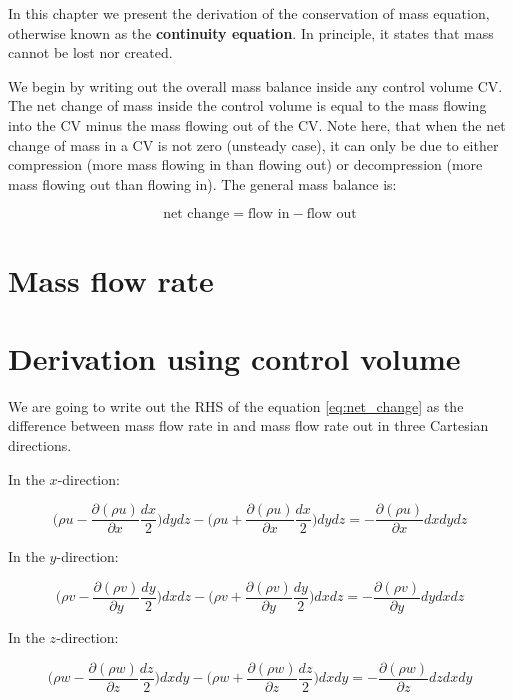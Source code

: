 In this chapter we present the derivation of the conservation of mass equation, otherwise known as the \textbf{continuity equation}. In principle, it states that mass cannot be lost nor created.

We begin by writing out the overall mass balance inside any control volume CV. The net change of mass inside the control volume is equal to the mass flowing into the CV minus the mass flowing out of the CV. Note here, that when the net change of mass in a CV is not zero (unsteady case), it can only be due to either compression (more mass flowing in than flowing out) or decompression (more mass flowing out than flowing in). The general mass balance is:

\begin{equation} \label{eq:net_change}
\text{net change} = \text{flow in} - \text{flow out}
\end{equation}

\section{Mass flow rate}

\section{Derivation using control volume}

We are going to write out the RHS of the equation \ref{eq:net_change} as the difference between mass flow rate in and mass flow rate out in three Cartesian directions.

In the $x$-direction:

\begin{equation}
\Big( \rho u - \frac{\partial (\rho u)}{\partial x} \frac{dx}{2} \Big) dy dz - \Big( \rho u + \frac{\partial (\rho u)}{\partial x} \frac{dx}{2} \Big) dy dz = - \frac{\partial (\rho u)}{\partial x} dx dy dz
\end{equation}

In the $y$-direction:

\begin{equation}
\Big( \rho v - \frac{\partial (\rho v)}{\partial y} \frac{dy}{2} \Big) dx dz - \Big( \rho v + \frac{\partial (\rho v)}{\partial y} \frac{dy}{2} \Big) dx dz = - \frac{\partial (\rho v)}{\partial y} dy dx dz
\end{equation}

In the $z$-direction:

\begin{equation}
\Big( \rho w - \frac{\partial (\rho w)}{\partial z} \frac{dz}{2} \Big) dx dy - \Big( \rho w + \frac{\partial (\rho w)}{\partial z} \frac{dz}{2} \Big) dx dy = - \frac{\partial (\rho w)}{\partial z} dz dx dy
\end{equation}

